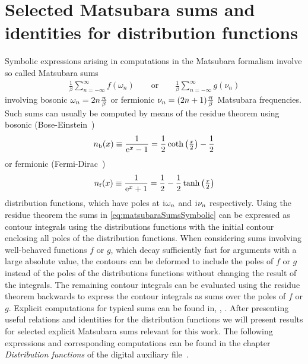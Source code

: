 \section{Selected Matsubara sums and identities for distribution functions}\label{app:matsubaraSums}
Symbolic expressions arising in computations in the Matsubara formalism involve so called Matsubara sums 
\begin{align}
	\frac{1}{\beta}\sum_{n=-\infty}^{\infty} f(\omega_n)\qquad\text{or}\qquad\frac{1}{\beta}\sum_{n=-\infty}^{\infty} g(\nu_n) \label{eq:matsubaraSumsSymbolic}
\end{align}
involving bosonic $\omega_n = 2n \tfrac{\mkern1.0mu\uppi\mkern1.0mu}{\beta}$ or fermionic $\nu_n=(2n+1)\tfrac{\mkern1.0mu\uppi\mkern1.0mu}{\beta}$ Matsubara frequencies.
Such sums can usually be computed by means of the residue theorem using bosonic (Bose-Einstein~\cite{Bose:1924mk})
\begin{align}
	n_\mathrm{b}(x)\equiv \frac{1}{\mathrm{e}^x-1}=\frac{1}{2}\coth\left(\tfrac{x}{2}\right)-\frac{1}{2}\label{eq:nfDef}
\end{align}
or fermionic (Fermi-Dirac~\cite{Fermi:1926,Fermi:1999ncp,Dirac:1926jz})
\begin{align}
	n_\mathrm{f}(x)\equiv \frac{1}{\mathrm{e}^x+1}=\frac{1}{2}-\frac{1}{2}\tanh\left(\tfrac{x}{2}\right) \label{eq:nbDef}
\end{align}
distribution functions, which have poles at $\mathrm{i}\mkern1mu \omega_n$ and $\mathrm{i}\mkern1mu \nu_n$ respectively.
Using the residue theorem the sums in \cref{eq:matsubaraSumsSymbolic} can be expressed as contour integrals using the distributions functions with the initial contour enclosing all poles of the distribution functions.
When considering sums involving well-behaved functions $f$ or $g$, which decay sufficiently fast for arguments with a large absolute value, the contours can be deformed to include the poles of $f$ or $g$ instead of the poles of the distributions functions without changing the result of the integrals.
The remaining contour integrals can be evaluated using the residue theorem backwards to express the contour integrals as sums over the poles of $f$ or $g$.
Explicit computations for typical sums can be found in, \eg{}, .
After presenting useful relations and identities for the distribution functions we will present results for selected explicit Matsubara sums relevant for this work.
The following expressions and corresponding computations can be found in the chapter \textit{Distribution functions} of the digital auxiliary file~\cite{Steil:2023PhDThermodynamicsNB}.

